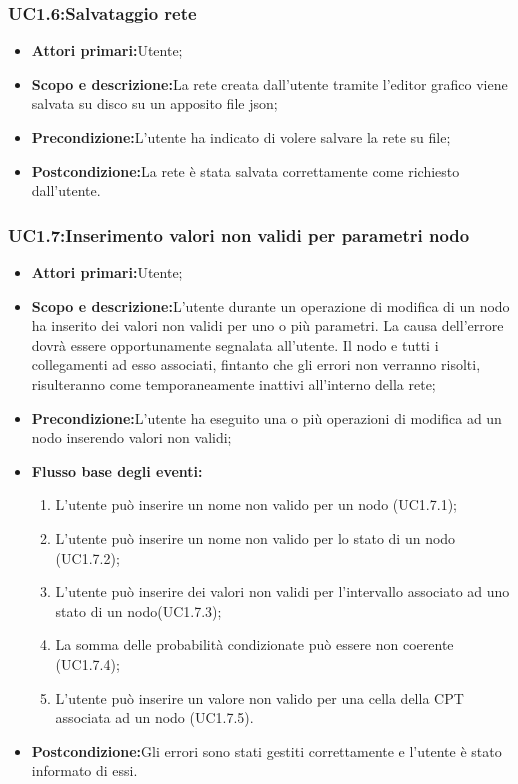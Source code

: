 \subsubsection{UC1.6:Salvataggio rete}
\begin{itemize}
	\item{\textbf{Attori primari:}Utente;}
	\item{\textbf{Scopo e descrizione:}La rete creata dall'utente tramite l'editor grafico viene salvata su disco su un apposito file json;}
	\item{\textbf{Precondizione:}L'utente ha indicato di volere salvare la rete su file;}
	\item{\textbf{Postcondizione:}La rete è stata salvata correttamente come richiesto dall'utente.}
\end{itemize}
\subsubsection{UC1.7:Inserimento valori non validi per parametri nodo}
\begin{itemize}
	\item{\textbf{Attori primari:}Utente;}
	\item{\textbf{Scopo e descrizione:}L'utente durante un operazione di modifica di un nodo ha inserito dei valori non validi per uno o più parametri. La causa dell'errore dovrà essere opportunamente segnalata all'utente. Il nodo e tutti i collegamenti ad esso associati, fintanto che gli errori non verranno risolti, risulteranno come temporaneamente inattivi all'interno della rete;}
	\item{\textbf{Precondizione:}L'utente ha eseguito una o più operazioni di modifica ad un nodo inserendo valori non validi;}
	\item{\textbf{Flusso base degli eventi:}}
	\begin{enumerate}
	\item{L'utente può inserire un nome non valido per un nodo (UC1.7.1);}
	\item{L'utente può inserire un nome non valido per lo stato di un nodo (UC1.7.2);}
	\item{L'utente può inserire dei valori non validi per l'intervallo associato ad uno stato di un nodo(UC1.7.3);}
	\item{La somma delle probabilità condizionate può essere non coerente (UC1.7.4);}
	\item{L'utente può inserire un valore non valido per una cella della CPT associata ad un nodo (UC1.7.5).}
	\end{enumerate}
	\item{\textbf{Postcondizione:}Gli errori sono stati gestiti correttamente e l'utente è stato informato di essi.}
\end{itemize}
